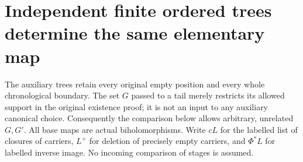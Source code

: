 \section{Independent finite ordered trees determine the same elementary map}

The auxiliary trees retain every original empty position and every whole
chronological boundary. The set $G$ passed to a tail merely restricts its
allowed support in the original existence proof; it is not an input to
any auxiliary canonical choice. Consequently the comparison below allows
arbitrary, unrelated $G,G'$. All base maps are actual biholomorphisms.
Write $cL$ for the labelled list of closures of carriers, $L^+$ for
deletion of precisely empty carriers, and $\Phi^*L$ for labelled inverse
image. No incoming comparison of stages is assumed.

